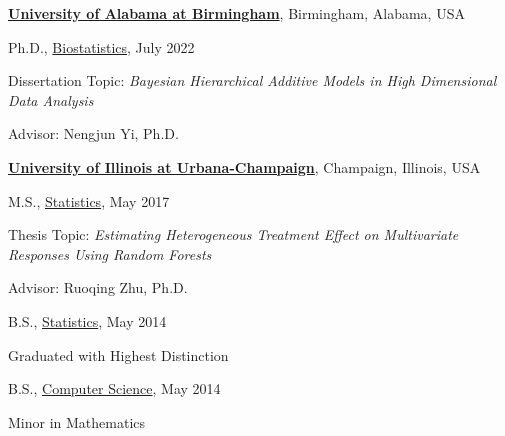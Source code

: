 \documentclass[10pt]{article}
\newenvironment{outerlist}[1][\enskip\textbullet]%
        {\begin{enumerate}[#1]}{\end{enumerate}%
         \vspace{-.6\baselineskip}}
\newenvironment{innerlist}[1][\enskip\textbullet]%
        {\begin{compactenum}[#1]}{\end{compactenum}}
\begin{document}
\href{http://www.uab.edu/}{\textbf{University of Alabama at Birmingham}}, 
Birmingham, Alabama, USA
\begin{outerlist}
		\item[] Ph.D., 
        \href{https://www.soph.uab.edu/bst}
             {Biostatistics}, July 2022
        \begin{innerlist}
        \item {Dissertation Topic: {\it Bayesian Hierarchical Additive Models in High Dimensional Data Analysis}}
        \item Advisor: Nengjun Yi, Ph.D. \\
		\end{innerlist}
\end{outerlist}

\href{http://illinois.edu/}{\textbf{University of Illinois at Urbana-Champaign}}, 
Champaign, Illinois, USA
\begin{outerlist}
\item[] M.S., 
        \href{https://stat.illinois.edu/}
             {Statistics}, May 2017
        \begin{innerlist}
        \item Thesis Topic: {\it Estimating Heterogeneous Treatment Effect on Multivariate Responses Using Random Forests}
      \item Advisor: {Ruoqing Zhu, Ph.D.}
        \end{innerlist}
\item[] B.S., 
        \href{https://stat.illinois.edu/}
             {Statistics}, May 2014
                \begin{innerlist}        
             	\item Graduated with Highest Distinction
             \end{innerlist}
\item[] B.S., 
        \href{https://cs.illinois.edu/}
             {Computer Science}, May 2014
        \begin{innerlist}        
        \item Minor in Mathematics
        \end{innerlist}
\end{outerlist}
\end{document}
